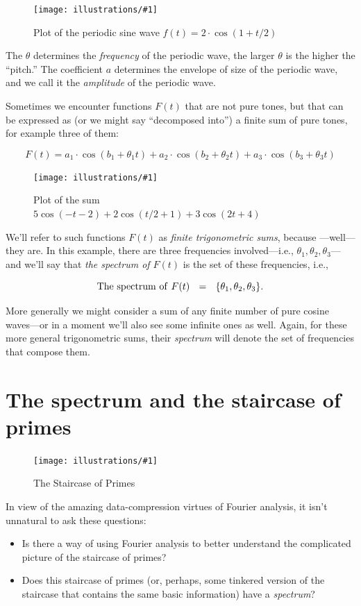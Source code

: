 \documentclass[openany]{book}
\newcommand{\ill}[3]{%
   \begin{figure}[H]%
   \vspace{-2ex}
   \centering%
   \texttt{[image: illustrations/\#1]}%
   \caption{#3}%
   \vspace{-2ex}
    \end{figure}}
\theoremstyle{plain}
\theoremstyle{definition}
\begin{document}
{{\ill{pure_tone}{.7}{Plot of the periodic sine wave $f(t) = 2\cdot \cos(1+t/2)$}

The $\theta$ determines the {\it frequency} of the periodic wave, the
larger $\theta$ is the higher the ``pitch.''  The coefficient $a$
determines the envelope of size of the periodic wave, and we call it
the {\it amplitude} of the periodic wave.

Sometimes we encounter functions $F(t)$ that are not pure tones, but
that can be expressed as (or we might say ``decomposed into'') a finite
sum of pure tones, for example three of them:

$$F(t)  = a_1\cdot \cos(b_1 +\theta_1 t) + a_2\cdot \cos(b_2 +\theta_2 t) + a_3\cdot \cos(b_3 +\theta_3 t)$$

\ill{mixed_tone3}{.7}{Plot of the sum $5  \cos\left(-t - 2\right) + 2 \cos\left(t/2 + 1\right) + 3  \cos\left(2  t + 4\right)$}

We'll refer to such functions $F(t)$ as {\it finite trigonometric
  sums}, because ---well---they are.  In this example, there are three
frequencies involved---i.e., $\theta_1,\theta_2,\theta_3$---and we'll
say that {\it the spectrum of $F(t)$} is the set of these frequencies,
i.e.,

$$
  {\rm The\ spectrum \ of \ } F(t) \ \ = \ \ \{\theta_1,\theta_2,\theta_3\}.
$$

More generally we might consider a sum of any finite number of pure
cosine waves---or in a moment we'll also see some infinite ones as
well. Again, for these more general trigonometric sums, their {\it
  spectrum} will denote the set of frequencies that compose them.

\chapter{The spectrum and the staircase of primes\label{sec:fourier_staircase}}

\ill{prime_pi_100_aspect1}{0.95}{The Staircase of Primes\label{fig:staircase100}}


In view of the amazing data-compression virtues of Fourier analysis,
it isn't unnatural to ask these questions:

\begin{itemize}
\item Is there a way of using Fourier analysis to better understand
  the complicated picture of the staircase of primes?

\item Does this staircase of primes (or, perhaps, some tinkered
  version of the staircase that contains the same basic information)
  have a {\it spectrum}?


\end{itemize}}}
\end{document}
